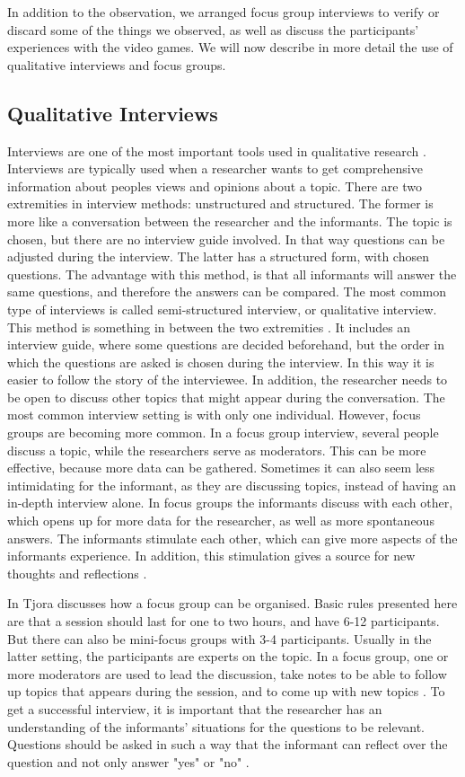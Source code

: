 In addition to the observation, we arranged focus group interviews to verify or discard some of the things we observed, as well as discuss the participants' experiences with the video games. We will now describe in more detail the use of qualitative interviews and focus groups.  

\subsection{Qualitative Interviews}
\label{sec:qualitativeInterviews}
Interviews are one of the most important tools used in qualitative research \cite{interview}. Interviews are typically used when a researcher wants to get comprehensive information about peoples views and opinions about a topic. There are two extremities in interview methods: unstructured and structured. The former is more like a conversation between the researcher and the informants. The topic is chosen, but there are no interview guide involved. In that way questions can be adjusted during the interview. The latter has a structured form, with chosen questions. The advantage with this method, is that all informants will answer the same questions, and therefore the answers can be compared. The most common type of interviews is called semi-structured interview, or qualitative interview. This method is something in between the two extremities \cite{qualitative}. It includes an interview guide, where some questions are decided beforehand, but the order in which the questions are asked is chosen during the interview. In this way it is easier to follow the story of the interviewee. In addition, the researcher needs to be open to discuss other topics that might appear during the conversation. The most common interview setting is with only one individual. However, focus groups are becoming more common. In a focus group interview, several people discuss a topic, while the researchers serve as moderators. This can be more effective, because more data can be gathered. Sometimes it can also seem less intimidating for the informant, as they are discussing topics, instead of having an in-depth interview alone. In focus groups the informants discuss with each other, which opens up for more data for the researcher, as well as more spontaneous answers. The informants stimulate each other, which can give more aspects of the informants experience. In addition, this stimulation gives a source for new thoughts and reflections \cite{tjora}. 

In \cite{tjora} Tjora discusses how a focus group can be organised. Basic rules presented here are that a session should last for one to two hours, and have 6-12 participants. But there can also be mini-focus groups with 3-4 participants. Usually in the latter setting, the participants are experts on the topic. In a focus group, one or more moderators are used to lead the discussion, take notes to be able to follow up topics that appears during the session, and to come up with new topics \cite{tjora}. To get a successful interview, it is important that the researcher has an understanding of the informants’ situations for the questions to be relevant. Questions should be asked in such a way that the informant can reflect over the question and not only answer "yes" or "no" \cite{qualitative}.

